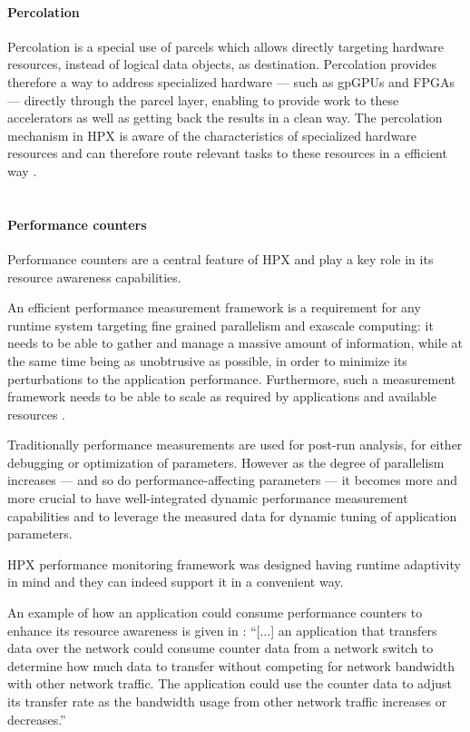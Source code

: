 \paragraph{Percolation}
Percolation is a special use of parcels which allows directly targeting hardware resources, instead of logical data objects, as destination.
Percolation provides therefore a way to address specialized hardware --- such as gpGPUs and FPGAs --- directly through the parcel layer, enabling to provide work to these accelerators as well as getting back the results in a clean way.
The percolation mechanism in HPX is aware of the characteristics of specialized hardware resources and can therefore route relevant tasks to these resources in a efficient way \cite{amatya2014parallel}.
~\\~

\paragraph{Performance counters}
Performance counters are a central feature of HPX and play a key role in its resource awareness capabilities.

An efficient performance measurement framework is a requirement for any runtime system targeting fine grained parallelism and exascale computing: it needs to be able to gather and manage a massive amount of information, while at the same time being as unobtrusive as possible, in order to minimize its perturbations to the application performance. Furthermore, such a measurement framework needs to be able to scale as required by applications and available resources \cite{amatya2014parallel}.

Traditionally performance measurements are used for post-run analysis, for either debugging or optimization of parameters.
However as the degree of parallelism increases --- and so do performance-affecting parameters --- it becomes more and more crucial to have well-integrated dynamic performance measurement capabilities and to leverage the measured data for dynamic tuning of application parameters.

HPX performance monitoring framework was designed having runtime adaptivity in mind \cite{kaiser2014hpx} and they can indeed support it in a convenient way.

An example of how an application could consume performance counters to enhance its resource awareness is given in \cite{grubel2016dynamic}:
``[...] an application that transfers data over the network could consume counter data from a network switch to determine how much data to transfer without competing for network bandwidth with other network traffic. The application could use the counter data to adjust its transfer rate as the bandwidth usage from other network traffic increases or decreases.''

